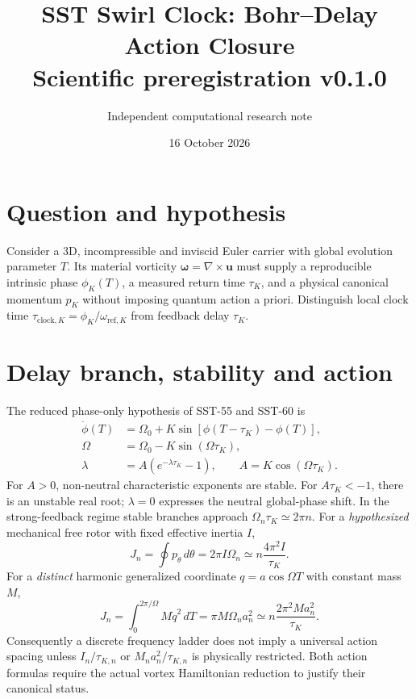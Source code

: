 \documentclass[11pt]{article}
\begin{document}
\title{SST Swirl Clock: Bohr--Delay Action Closure\\Scientific preregistration v0.1.0}
\author{Independent computational research note}
\date{16 October 2026}
\maketitle
\section{Question and hypothesis}
Consider a 3D, incompressible and inviscid Euler carrier with global evolution parameter $T$. Its material vorticity $\boldsymbol\omega=\nabla\times\mathbf u$ must supply a reproducible intrinsic phase $\phi_K(T)$, a measured return time $\tau_K$, and a physical canonical momentum $p_K$ without imposing quantum action a priori. Distinguish local clock time $\tau_{\mathrm{clock},K}=\phi_K/\omega_{\mathrm{ref},K}$ from feedback delay $\tau_K$.
\section{Delay branch, stability and action}
The reduced phase-only hypothesis of SST-55 and SST-60 is
\begin{align}
\dot\phi(T)&=\Omega_0+K\sin[\phi(T-\tau_K)-\phi(T)],\\
\Omega&=\Omega_0-K\sin(\Omega\tau_K),\\
\lambda&=A(e^{-\lambda\tau_K}-1),\qquad A=K\cos(\Omega\tau_K).
\end{align}
For $A>0$, non-neutral characteristic exponents are stable. For $A\tau_K<-1$, there is an unstable real root; $\lambda=0$ expresses the neutral global-phase shift. In the strong-feedback regime stable branches approach $\Omega_n\tau_K\simeq 2\pi n$.
For a \emph{hypothesized} mechanical free rotor with fixed effective inertia $I$,
\begin{equation}
J_n=\oint p_\theta\,d\theta=2\pi I\Omega_n\simeq n\frac{4\pi^2I}{\tau_K}.
\end{equation}
For a \emph{distinct} harmonic generalized coordinate $q=a\cos\Omega T$ with constant mass $M$,
\begin{equation}
J_n=\int_0^{2\pi/\Omega}M\dot q^2\,dT=\pi M\Omega_n a_n^2\simeq n\frac{2\pi^2M a_n^2}{\tau_K}.
\end{equation}
Consequently a discrete frequency ladder does not imply a universal action spacing unless $I_n/\tau_{K,n}$ or $M_n a_n^2/\tau_{K,n}$ is physically restricted. Both action formulas require the actual vortex Hamiltonian reduction to justify their canonical status.
\end{document}

